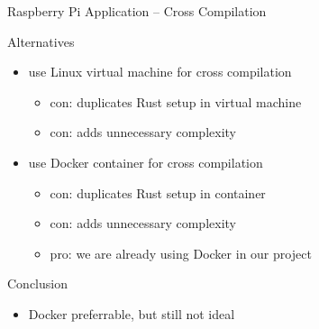 \documentclass[aspectratio=1610]{beamer}
\newcommand\green[1]{{\color{green(ncs)}#1}}
\newcommand\red[1]{{\color{amaranth}#1}}
\begin{document}
  \begin{frame}{Raspberry Pi Application -- Cross Compilation}
    \begin{block}{Alternatives}
      \begin{itemize}
        \item use Linux virtual machine for cross compilation
        \begin{itemize}
          \item \red{con:} duplicates Rust setup in virtual machine
          \item \red{con:} adds unnecessary complexity
        \end{itemize}
        \item use Docker container for cross compilation
        \begin{itemize}
          \item \red{con:} duplicates Rust setup in container
          \item \red{con:} adds unnecessary complexity
          \item \green{pro:} we are already using Docker in our project
        \end{itemize}
      \end{itemize}
    \end{block}

     {
    \begin{block}{Conclusion}
      \begin{itemize}
        \item Docker preferrable, but still not ideal
      \end{itemize}
    \end{block}
    }
  \end{frame}
\end{document}
